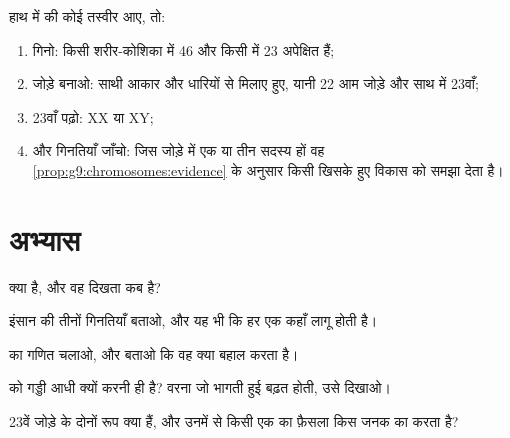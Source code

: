 \begin{method}[कोई गुणसूत्र-चित्र पढ़ना]\label{met:g9:chromosomes:read}
हाथ में  की कोई तस्वीर आए, तो:
\begin{enumerate}
  \item गिनो: किसी शरीर-कोशिका में 46 और किसी  में 23 अपेक्षित
        हैं;
  \item जोड़े बनाओ: साथी आकार और धारियों से मिलाए हुए, यानी 22 आम
        जोड़े और साथ में 23वाँ;
  \item 23वाँ पढ़ो: XX या XY;
  \item और गिनतियाँ जाँचो: जिस जोड़े में एक या तीन सदस्य हों वह
        \cref{prop:g9:chromosomes:evidence} के अनुसार किसी खिसके हुए
        विकास को समझा देता है।
\end{enumerate}
\end{method}

\section{अभ्यास}

\begin{exercise}[$\star$]\label{exo:g9:chromosomes:1}
 क्या है, और वह दिखता कब है?
\end{exercise}

\begin{exercise}[$\star$]\label{exo:g9:chromosomes:2}
इंसान की तीनों गिनतियाँ बताओ, और यह भी कि हर एक कहाँ लागू होती है।
\end{exercise}

\begin{exercise}[$\star$]\label{exo:g9:chromosomes:3}
 का गणित चलाओ, और बताओ कि वह क्या बहाल करता है।
\end{exercise}

\begin{exercise}[$\star$]\label{exo:g9:chromosomes:4}
 को गड्डी आधी क्यों करनी ही है? वरना जो भागती हुई बढ़त होती,
उसे दिखाओ।
\end{exercise}

\begin{exercise}[$\star$]\label{exo:g9:chromosomes:5}
23वें जोड़े के दोनों रूप क्या हैं, और उनमें से किसी एक का फ़ैसला किस जनक
का  करता है?
\end{exercise}


